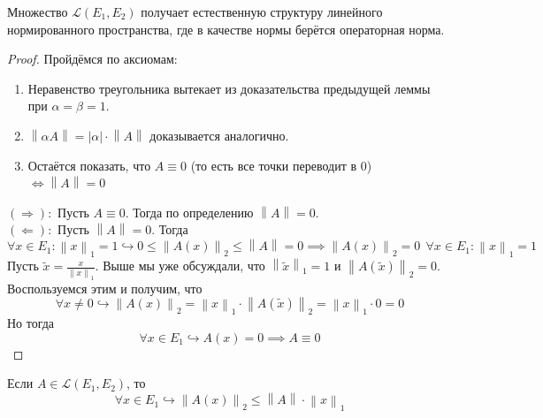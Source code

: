 \documentclass[11pt]{article}
\begin{document}
\begin{remark}
    Множество $\mathcal{L}(E_1, E_2)$ получает естественную структуру линейного нормированного пространства, где в качестве 
    нормы берётся операторная норма.
\end{remark}

\begin{proof}
    Пройдёмся по аксиомам:
    \begin{enumerate}
        \item Неравенство треугольника вытекает из доказательства предыдущей леммы при $\alpha = \beta = 1$.
        \item $\left\lVert \alpha A \right\rVert = \left\lvert \alpha \right\rvert \cdot \left\lVert A \right\rVert$ доказывается аналогично.
        \item Остаётся показать, что $A \equiv 0$ (то есть все точки переводит в 0) $\Longleftrightarrow \left\lVert A \right\rVert = 0$
    \end{enumerate}
    $(\Longrightarrow):$ Пусть $A \equiv 0$. Тогда по определению $\left\lVert A \right\rVert = 0$. \\
    $(\Longleftarrow):$ Пусть $\left\lVert A \right\rVert = 0$. Тогда 
    \[\forall x \in E_1: \left\lVert x \right\rVert_1 = 1 \hookrightarrow 0 \leq \left\lVert A(x) \right\rVert_2 \leq \left\lVert A \right\rVert = 0 \implies \left\lVert A(x) \right\rVert_2 = 0 \ \ \forall x \in E_1: \left\lVert x \right\rVert_1 = 1\]
    Пусть $\widetilde{x} = \frac{x}{\left\lVert x \right\rVert_1}$. Выше мы уже обсуждали, что 
    $\left\lVert \widetilde{x} \right\rVert_1 = 1$ и $\left\lVert A(\widetilde{x}) \right\rVert_2 = 0$. 
    Воспользуемся этим и получим, что 
    \[\forall x \neq 0 \hookrightarrow \left\lVert A(x) \right\rVert_2 = \left\lVert x \right\rVert_1 \cdot \left\lVert A(\widetilde{x}) \right\rVert_2 = \left\lVert x \right\rVert_1 \cdot 0 = 0\]
    Но тогда 
    \[\forall x \in E_1 \hookrightarrow  A(x)  = 0 \implies A \equiv 0\]
\end{proof}

\begin{lemma}
    Если $A \in \mathcal{L}(E_1, E_2)$, то 
    \[\forall x \in E_1 \hookrightarrow \left\lVert A(x) \right\rVert_2 \leq \left\lVert A \right\rVert \cdot \left\lVert x \right\rVert_1\]
\end{lemma}
\end{document}
